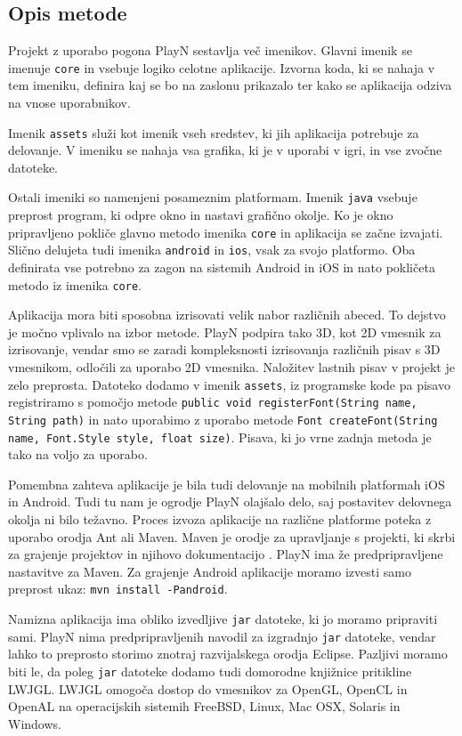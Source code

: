 \subsection{Opis metode}

Projekt z uporabo pogona PlayN sestavlja več imenikov. Glavni imenik se imenuje \texttt{core} in vsebuje logiko celotne aplikacije. Izvorna koda, ki se nahaja v tem imeniku, definira kaj se bo na zaslonu prikazalo ter kako se aplikacija odziva na vnose uporabnikov. 



Imenik \texttt{assets} služi kot imenik vseh sredstev, ki jih aplikacija potrebuje za delovanje. V imeniku se nahaja vsa grafika, ki je v uporabi v igri, in vse zvočne datoteke.

Ostali imeniki so namenjeni posameznim platformam. Imenik \texttt{java} vsebuje preprost program, ki odpre okno in nastavi grafično okolje. Ko je okno pripravljeno pokliče glavno metodo imenika \texttt{core} in aplikacija se začne izvajati. Slično delujeta tudi imenika \texttt{android} in \texttt{ios}, vsak za svojo platformo. Oba definirata vse potrebno za zagon na sistemih Android in iOS in nato pokličeta metodo iz imenika \texttt{core}.

Aplikacija mora biti sposobna izrisovati velik nabor različnih abeced. To dejstvo je močno vplivalo na izbor metode. PlayN podpira tako 3D, kot 2D vmesnik za izrisovanje, vendar smo se zaradi kompleksnosti izrisovanja različnih pisav s 3D vmesnikom, odločili za uporabo 2D vmesnika. Naložitev lastnih pisav v projekt je zelo preprosta. Datoteko dodamo v imenik \texttt{assets}, iz programske kode pa pisavo registriramo s pomočjo metode \texttt{public void registerFont(String name, String path)} in nato uporabimo z uporabo metode \texttt{Font createFont(String name, Font.Style style, float size)}. Pisava, ki jo vrne zadnja metoda je tako na voljo za uporabo.

Pomembna zahteva aplikacije je bila tudi delovanje na mobilnih platformah iOS in Android. Tudi tu nam je ogrodje PlayN olajšalo delo, saj postavitev delovnega okolja ni bilo težavno. Proces izvoza aplikacije na različne platforme poteka z uporabo orodja Ant ali Maven. Maven je orodje za upravljanje s projekti, ki skrbi za grajenje projektov in njihovo dokumentacijo \cite{mvn}. PlayN ima že predpripravljene nastavitve za Maven. Za grajenje Android aplikacije moramo izvesti samo preprost ukaz: \texttt{mvn install -Pandroid}. 

Namizna aplikacija ima obliko izvedljive \texttt{jar} datoteke, ki jo moramo pripraviti sami. PlayN nima predpripravljenih navodil za izgradnjo \texttt{jar} datoteke, vendar lahko to preprosto storimo znotraj razvijalskega orodja Eclipse. Pazljivi moramo biti le, da poleg \texttt{jar} datoteke dodamo tudi domorodne knjižnice pritikline LWJGL. LWJGL \cite{lwjgl} omogoča dostop do vmesnikov za OpenGL, OpenCL in OpenAL na operacijskih sistemih FreeBSD, Linux, Mac OSX, Solaris in Windows.

